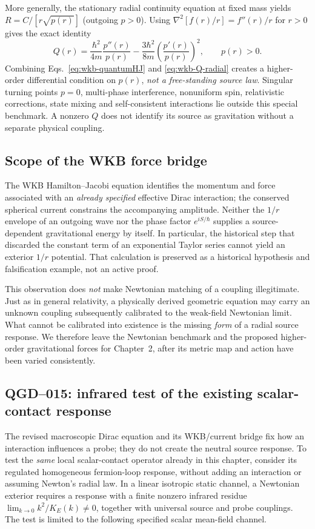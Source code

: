 \documentclass[11pt,a4paper]{article}
\begin{document}
More generally, the stationary radial continuity equation at fixed mass yields $R=C/[r\sqrt{p(r)}]$ (outgoing $p>0$).  Using $\nabla^2[f(r)/r]=f''(r)/r$ for $r>0$ gives the exact identity
\begin{equation}\label{eq:wkb-Q-radial}
\boxed{Q(r)=\frac{\hbar^2}{4m}\frac{p''(r)}{p(r)}
-\frac{3\hbar^2}{8m}\left(\frac{p'(r)}{p(r)}\right)^2},
\qquad p(r)>0.
\end{equation}
Combining Eqs.~\eqref{eq:wkb-quantumHJ} and \eqref{eq:wkb-Q-radial} creates a higher-order differential condition on $p(r)$, \emph{not a free-standing source law}.  Singular turning points $p=0$, multi-phase interference, nonuniform spin, relativistic corrections, state mixing and self-consistent interactions lie outside this special benchmark.  A nonzero $Q$ does not identify its source as gravitation without a separate physical coupling.

\subsection{Scope of the WKB force bridge}\label{sec:wkb-newton}
The WKB Hamilton--Jacobi equation identifies the momentum and force associated with an \emph{already specified} effective Dirac interaction; the conserved spherical current constrains the accompanying amplitude. Neither the $1/r$ envelope of an outgoing wave nor the phase factor $e^{iS/\hbar}$ supplies a source-dependent gravitational energy by itself. In particular, the historical step that discarded the constant term of an exponential Taylor series cannot yield an exterior $1/r$ potential. That calculation is preserved as a historical hypothesis and falsification example, not an active proof.

This observation does \emph{not} make Newtonian matching of a coupling illegitimate. Just as in general relativity, a physically derived geometric equation may carry an unknown coupling subsequently calibrated to the weak-field Newtonian limit. What cannot be calibrated into existence is the missing \emph{form} of a radial source response. We therefore leave the Newtonian benchmark and the proposed higher-order gravitational forces for Chapter~2, after its metric map and action have been varied consistently.

\subsection{QGD--015: infrared test of the existing scalar-contact response}\label{sec:qgd015-ir}
The revised macroscopic Dirac equation and its WKB/current bridge fix how an interaction influences a probe; they do not create the neutral source response. To test the \emph{same} local scalar-contact operator already in this chapter, consider its regulated homogeneous fermion-loop response, without adding an interaction or assuming Newton's radial law. In a linear isotropic static channel, a Newtonian exterior requires a response with a finite nonzero infrared residue $\lim_{k\to0}k^2/K_E(k)\ne0$, together with universal source and probe couplings. The test is limited to the following specified scalar mean-field channel.
\end{document}
